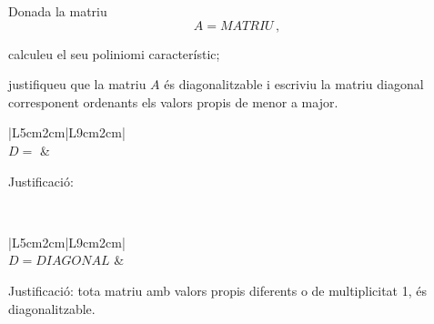 \begin{enunciat}
Donada la matriu
\[
   A=MATRIU\,,
\]
\begin{apartats}
\item calculeu el seu poliniomi característic;
\item justifiqueu que la matriu $A$ és diagonalitzable i escriviu la matriu diagonal corresponent  ordenants els valors propis de menor a major.
\end{apartats}
\end{enunciat}

\begin{quadricula}
\begin{tabular}{|L{5cm}{2cm}|L{9cm}{2cm}|}
\hline
{} \\
\hline
$D=$ & \begin{minipage}[t]{8.8cm}Justificació:\vspace{1.8cm} \end{minipage}\\
\hline
\end{tabular}
\end{quadricula}

\begin{solucio}
\begin{center}
\begin{tabular}{|L{5cm}{2cm}|L{9cm}{2cm}|}
\hline
{} \\
\hline
$D=DIAGONAL$ & 
\begin{minipage}[t]{8.8cm}
Justificació: tota matriu amb valors propis diferents o de multiplicitat 1, és diagonalitzable.
\vspace{1cm}
\end{minipage} \\
\hline
\end{tabular}
\end{center}
\end{solucio}



